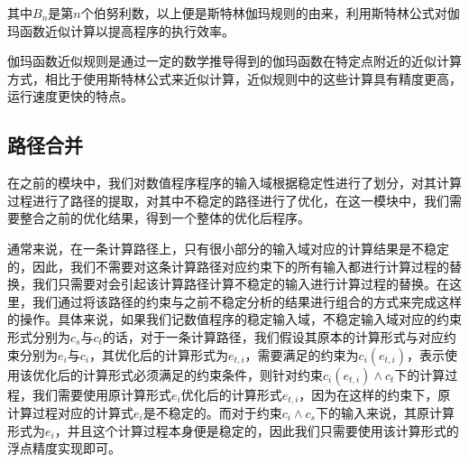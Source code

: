 其中$B_n$是第$n$个伯努利数\cite{Rademacher1973}，以上便是斯特林伽玛规则的由来，利用斯特林公式对伽玛函数近似计算以提高程序的执行效率。

伽玛函数近似规则是通过一定的数学推导得到的伽玛函数在特定点附近的近似计算方式，相比于使用斯特林公式来近似计算，近似规则中的这些计算具有精度更高，运行速度更快的特点。

\subsection{路径合并}

在之前的模块中，我们对数值程序程序的输入域根据稳定性进行了划分，对其计算过程进行了路径的提取，对其中不稳定的路径进行了优化，在这一模块中，我们需要整合之前的优化结果，得到一个整体的优化后程序。

通常来说，在一条计算路径上，只有很小部分的输入域对应的计算结果是不稳定的\cite{zou_genetic_2015}，因此，我们不需要对这条计算路径对应约束下的所有输入都进行计算过程的替换，我们只需要对会引起该计算路径计算不稳定的输入进行计算过程的替换。在这里，我们通过将该路径的约束与之前不稳定分析的结果进行组合的方式来完成这样的操作。具体来说，如果我们记数值程序的稳定输入域，不稳定输入域对应的约束形式分别为$c_s$与$c_t$的话，对于一条计算路径，我们假设其原本的计算形式与对应约束分别为$e_i$与$c_i$，其优化后的计算形式为$e_{t,i}$，需要满足的约束为$c_i(e_{t,i})$，表示使用该优化后的计算形式必须满足的约束条件，则针对约束$c_i(e_{t,i})\wedge c_t$下的计算过程，我们需要使用原计算形式$e_i$优化后的计算形式$e_{t,i}$，因为在这样的约束下，原计算过程对应的计算式$e_i$是不稳定的。而对于约束$c_i \wedge c_s$下的输入来说，其原计算形式为$e_i$，并且这个计算过程本身便是稳定的，因此我们只需要使用该计算形式的浮点精度实现即可。

